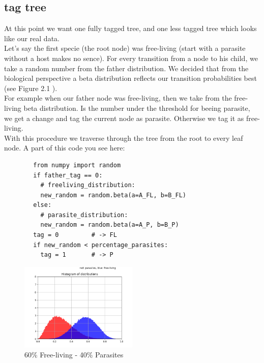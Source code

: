     \subsection{tag tree}
      At this point we want one fully tagged tree, and one less tagged tree which looks like our real 
        data.\\
      Let's say the first specie (the root node) was free-living (start with a parasite without a host 
        makes no sence). For every transition from a node to his child, we take a random number from
        the father distribution. We decided that from the biological perspective a beta distribution
        reflects our transition probabilities best (see Figure 2.1 ). \\
        For example when our father node was free-living, then we take from the free-living beta
        distribution. Is the number under the threshold for beeing parasite, we get a change and tag
        the current node as parasite. Otherwise we tag it as free-living. \\
        With this procedure we traverse through the tree from the root to every leaf node. A part of
        this code you see here:
      \begin{lstlisting}
        from numpy import random
        if father_tag == 0:
          # freeliving_distribution:
          new_random = random.beta(a=A_FL, b=B_FL)
        else:
          # parasite_distribution:
          new_random = random.beta(a=A_P, b=B_P)
        tag = 0         # -> FL
        if new_random < percentage_parasites:
          tag = 1       # -> P
      \end{lstlisting}
      \begin{figure}
        \caption{60\% Free-living - 40\% Parasites}
        \centering
          \includegraphics[width=0.5\textwidth]{Figures/40-60.png}
      \end{figure}
